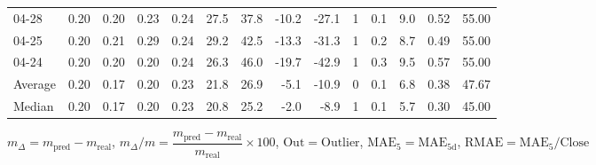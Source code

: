 \begin{threeparttable}
{\begin{tabular}{lrrrrrrrrrrrrr}
  04-28 &          0.20 &          0.20 &          0.23 &        0.24 &                27.5 &                37.8 &      -10.2 &        -27.1 &              1 &                 0.1 &              9.0 &            0.52 &                  55.00 \\
  04-25 &          0.20 &          0.21 &          0.29 &        0.24 &                29.2 &                42.5 &      -13.3 &        -31.3 &              1 &                 0.2 &              8.7 &            0.49 &                  55.00 \\
  04-24 &          0.20 &          0.20 &          0.20 &        0.24 &                26.3 &                46.0 &      -19.7 &        -42.9 &              1 &                 0.3 &              9.5 &            0.57 &                  55.00 \\
Average &          0.20 &          0.17 &          0.20 &        0.23 &                21.8 &                26.9 &       -5.1 &        -10.9 &              0 &                 0.1 &              6.8 &            0.38 &                  47.67 \\
 Median &          0.20 &          0.17 &          0.20 &        0.23 &                20.8 &                25.2 &       -2.0 &         -8.9 &              1 &                 0.1 &              5.7 &            0.30 &                  45.00 \\
\bottomrule
\end{tabular}
}
\begin{tablenotes}\footnotesize
\item $m_\Delta=m_{\text{pred}}-m_{\text{real}}$,
$m_\Delta/m=\dfrac{m_{\text{pred}}-m_{\text{real}}}{m_{\text{real}}}\times100$,
$\mathrm{Out}=\text{Outlier}$,
$\mathrm{MAE}_5=\mathrm{MAE}_{5\text{d}}$,
$\mathrm{RMAE}=\mathrm{MAE}_5/\text{Close}$
\end{tablenotes}
\end{threeparttable}
\endgroup

